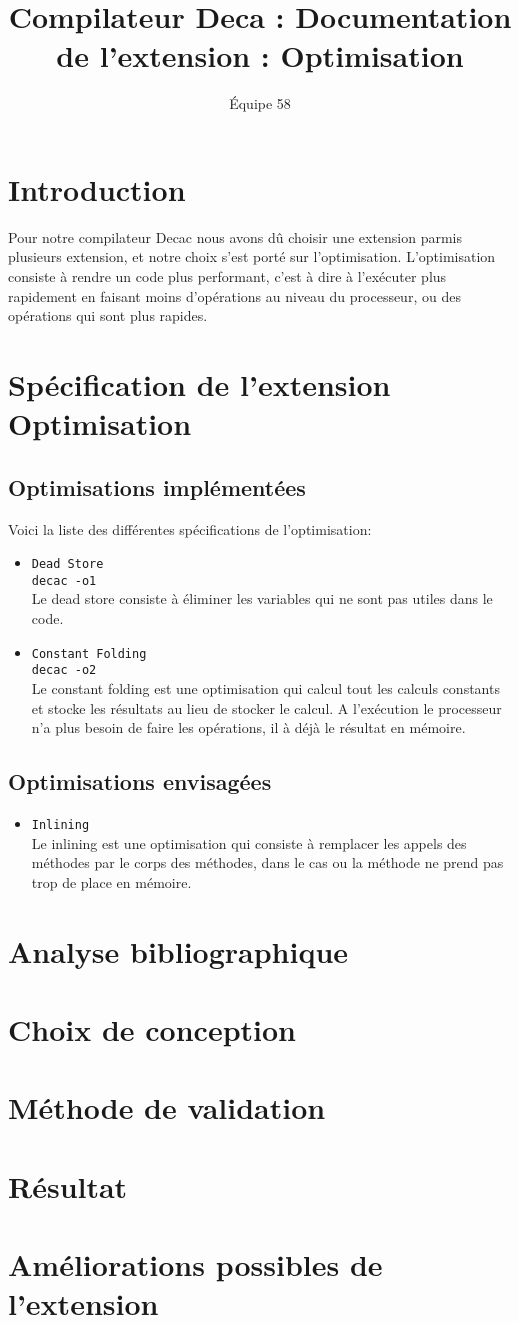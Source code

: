 \documentclass[a4paper]{article}
\begin{document}
\title{Compilateur Deca : Documentation de l'extension : Optimisation}
\author{\'Equipe 58}
\maketitle
\section{Introduction}
Pour notre compilateur Decac nous avons dû choisir une extension parmis plusieurs extension, et notre choix s'est porté sur l'optimisation. L'optimisation consiste à rendre un code plus performant, c'est à dire à l'exécuter plus rapidement en faisant moins d'opérations au niveau du processeur, ou des opérations qui sont plus rapides.
\section{Spécification de l'extension Optimisation}
\subsection{Optimisations implémentées}
Voici la liste des différentes spécifications de l'optimisation:
\begin{itemize}
\item \texttt{Dead Store} \\
      \texttt{decac -o1} \\
Le dead store consiste à éliminer les variables qui ne sont pas utiles dans le code.
\item \texttt{Constant Folding}\\
\texttt{decac -o2}\\
Le constant folding est une optimisation qui calcul tout les calculs constants et stocke les résultats au lieu de stocker le calcul. A l'exécution le processeur n'a plus besoin de faire les opérations, il à déjà le résultat en mémoire.
     \end{itemize}
\subsection{Optimisations envisagées}
\begin{itemize}
\item \texttt{Inlining} \\
Le inlining est une optimisation qui consiste à remplacer les appels des méthodes par le corps des méthodes, dans le cas ou la méthode ne prend pas trop de place en mémoire.
     \end{itemize}
\section{Analyse bibliographique}
\section{Choix de conception}
\section{Méthode de validation}
\section{Résultat}
\section{Améliorations possibles de l'extension}
\end{document}
